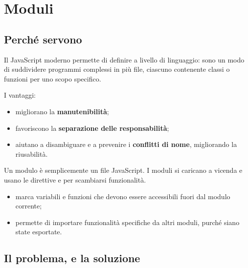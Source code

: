 \section{Moduli}

\subsection{Perché servono}

Il JavaScript moderno permette di definire  a livello di
linguaggio: sono un modo di suddividere programmi complessi in più file,
ciascuno contenente classi o funzioni per uno scopo specifico.

I vantaggi:

\begin{itemize}
  \item migliorano la \textbf{manutenibilità};
  \item favoriscono la \textbf{separazione delle responsabilità};
  \item aiutano a disambiguare e a prevenire i \textbf{conflitti di nome},
        migliorando la riusabilità.
\end{itemize}

Un modulo è semplicemente un file JavaScript. I moduli si caricano a vicenda e
usano le direttive  e  per scambiarsi funzionalità.

\begin{itemize}
  \item {} marca variabili e funzioni che devono essere accessibili
        fuori dal modulo corrente;
  \item {} permette di importare funzionalità specifiche da altri
        moduli, purché siano state esportate.
\end{itemize}

\subsection{Il problema, e la soluzione}

